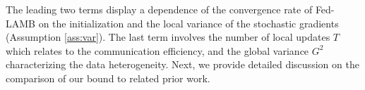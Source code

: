 \documentclass[nohyperref]{article}
\theoremstyle{plain}
\theoremstyle{definition}
\theoremstyle{remark}
\begin{document}
The leading two terms display a dependence of the convergence rate of Fed-LAMB on the initialization and the local variance of the stochastic gradients (Assumption \ref{ass:var}). The last term involves the number of local updates $T$ which relates to the communication efficiency, and the global variance $G^2$ characterizing the data heterogeneity. Next, we provide detailed discussion on the comparison of our bound to related prior work.



\end{document}

